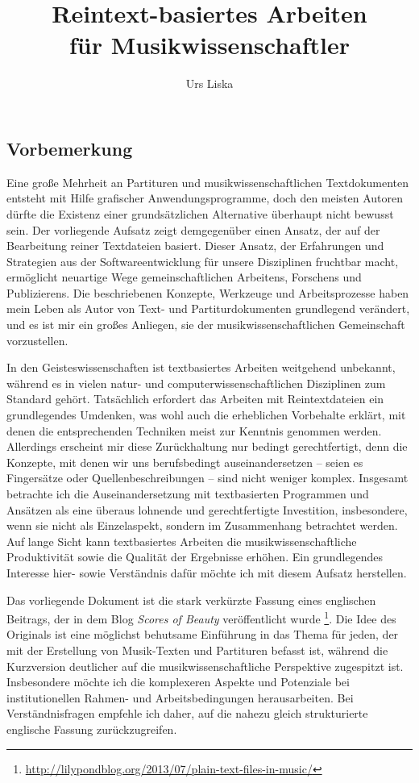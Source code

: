 \documentclass[DIV=12]{scrreprt}
\begin{document}
\title{Reintext-basiertes Arbeiten\\für Musikwissenschaftler}
\author{Urs Liska}
\maketitle

\subsection*{Vorbemerkung}
Eine große Mehrheit an Partituren und musikwissenschaftlichen Textdokumenten entsteht mit Hilfe grafischer Anwendungsprogramme, doch den meisten Autoren dürfte die Existenz einer grundsätzlichen Alternative überhaupt nicht bewusst sein.
Der vorliegende Aufsatz zeigt demgegenüber einen Ansatz, der auf der Bearbeitung reiner Textdateien basiert.
Dieser Ansatz, der Erfahrungen und Strategien aus der Softwareentwicklung für unsere Disziplinen fruchtbar macht, ermöglicht neuartige Wege gemeinschaftlichen Arbeitens, Forschens und Publizierens.
Die beschriebenen Konzepte, Werkzeuge und Arbeitsprozesse haben mein Leben als Autor von Text- und Partiturdokumenten grundlegend verändert, und es ist mir ein großes Anliegen, sie der musikwissenschaftlichen Gemeinschaft vorzustellen.

In den Geisteswissenschaften ist textbasiertes Arbeiten weitgehend unbekannt, während es in vielen natur- und computerwissenschaftlichen Disziplinen zum Standard gehört.
Tatsächlich erfordert das Arbeiten mit Reintextdateien ein grundlegendes Umdenken, was wohl auch die erheblichen Vorbehalte erklärt, mit denen die entsprechenden Techniken meist zur Kenntnis genommen werden.
Allerdings erscheint mir diese Zurückhaltung nur bedingt gerechtfertigt, denn die Konzepte, mit denen wir uns berufsbedingt auseinandersetzen -- seien es Fingersätze oder Quellenbeschreibungen -- sind nicht weniger komplex.
Insgesamt betrachte ich die Auseinandersetzung mit textbasierten Programmen und Ansätzen als eine überaus lohnende und gerechtfertigte Investition, insbesondere, wenn sie nicht als Einzelaspekt, sondern im Zusammenhang betrachtet werden.
Auf lange Sicht kann textbasiertes Arbeiten die musikwissenschaftliche Produktivität sowie die Qualität der Ergebnisse erhöhen.
Ein grundlegendes Interesse hier- sowie Verständnis dafür möchte ich mit diesem Aufsatz herstellen.

\medskip
Das vorliegende Dokument ist die stark verkürzte Fassung eines englischen Beitrags, der in dem Blog \emph{Scores of Beauty} veröffentlicht wurde%
\footnote{\url{http://lilypondblog.org/2013/07/plain-text-files-in-music/}}.
Die Idee des Originals ist eine möglichst behutsame Einführung in das Thema für jeden, der mit der Erstellung von Musik-Texten und Partituren befasst ist, während die Kurzversion deutlicher auf die musikwissenschaftliche Perspektive zugespitzt ist.
Insbesondere möchte ich die komplexeren Aspekte und Potenziale bei institutionellen Rahmen- und Arbeitsbedingungen herausarbeiten.
Bei Verständnisfragen empfehle ich daher, auf die nahezu gleich strukturierte englische 
Fassung zurückzugreifen.
\end{document}

